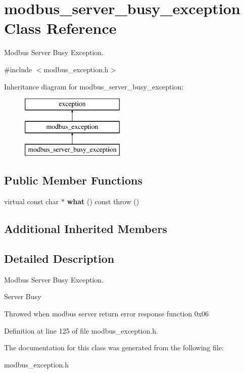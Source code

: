 \hypertarget{classmodbus__server__busy__exception}{}\section{modbus\+\_\+server\+\_\+busy\+\_\+exception Class Reference}
\label{classmodbus__server__busy__exception}


Modbus Server Busy Exception.  




{\ttfamily \#include $<$modbus\+\_\+exception.\+h$>$}

Inheritance diagram for modbus\+\_\+server\+\_\+busy\+\_\+exception\+:\begin{figure}[H]
\begin{center}
\leavevmode
\includegraphics[height=3.000000cm]{classmodbus__server__busy__exception}
\end{center}
\end{figure}
\subsection*{Public Member Functions}
\begin{DoxyCompactItemize}
\item 
\mbox{\label{classmodbus__server__busy__exception_a97bfecb04b195aec8040418e3cb00598}} 
virtual const char $\ast$ {\bfseries what} () const  throw ()
\end{DoxyCompactItemize}
\subsection*{Additional Inherited Members}


\subsection{Detailed Description}
Modbus Server Busy Exception. 

Server Busy

Throwed when modbus server return error response function 0x06 

Definition at line 125 of file modbus\+\_\+exception.\+h.



The documentation for this class was generated from the following file\+:\begin{DoxyCompactItemize}
\item 
modbus\+\_\+exception.\+h\end{DoxyCompactItemize}
